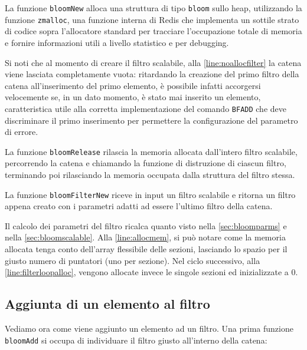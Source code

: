 

La funzione \verb|bloomNew| alloca una struttura di tipo \verb|bloom| sullo heap, utilizzando la
funzione \verb|zmalloc|, una funzione interna di Redis che implementa un sottile strato di codice
sopra l'allocatore standard per tracciare l'occupazione totale di memoria e fornire informazioni
utili a livello statistico e per debugging. 

Si noti che al momento di creare il filtro scalabile, alla \autoref{line:noallocfilter} la catena
viene lasciata completamente vuota: ritardando la creazione del primo filtro della catena
all'inserimento del primo elemento, è possibile infatti accorgersi velocemente se, in un dato
momento, è stato mai inserito un elemento, caratteristica utile alla corretta implementazione del
comando \verb|BFADD| che deve discriminare il primo inserimento per permettere la configurazione del
parametro di errore.

La funzione \verb|bloomRelease| rilascia la memoria allocata dall'intero filtro scalabile, percorrendo
la catena e chiamando la funzione di distruzione di ciascun filtro, terminando poi rilasciando la
memoria occupata dalla struttura del filtro stessa.



La funzione \verb|bloomFilterNew| riceve in input un filtro scalabile e ritorna un filtro appena
creato con i parametri adatti ad essere l'ultimo filtro della catena.

Il calcolo dei parametri del filtro ricalca quanto visto nella \autoref{sec:bloomparms} e nella
\autoref{sec:bloomscalable}. Alla \autoref{line:allocmem}, si può notare come la memoria
allocata tenga conto dell'array flessibile delle sezioni, lasciando lo spazio per il giusto numero
di puntatori (uno per sezione). Nel ciclo successivo, alla \autoref{line:filterloopalloc}, vengono
allocate invece le singole sezioni ed inizializzate a $0$.

\subsection{Aggiunta di un elemento al filtro}

Vediamo ora come viene aggiunto un elemento ad un filtro. Una prima funzione \verb|bloomAdd| si
occupa di individuare il filtro giusto all'interno della catena:


